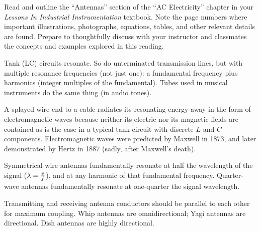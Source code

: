 

Read and outline the ``Antennas'' section of the ``AC Electricity'' chapter in your {\it Lessons In Industrial Instrumentation} textbook.  Note the page numbers where important illustrations, photographs, equations, tables, and other relevant details are found.  Prepare to thoughtfully discuss with your instructor and classmates the concepts and examples explored in this reading.














Tank (LC) circuits resonate.  So do unterminated transmission lines, but with multiple resonance frequencies (not just one): a fundamental frequency plus harmonics (integer multiples of the fundamental).  Tubes used in musical instruments do the same thing (in audio tones).

\vskip 10pt

A splayed-wire end to a cable radiates its resonating energy away in the form of electromagnetic waves because neither its electric nor its magnetic fields are contained as is the case in a typical tank circuit with discrete $L$ and $C$ components.  Electromagnetic waves were predicted by Maxwell in 1873, and later demonstrated by Hertz in 1887 (sadly, after Maxwell's death).

\vskip 10pt

Symmetrical wire antennas fundamentally resonate at half the wavelength of the signal ($\lambda = {v \over f}$), and at any harmonic of that fundamental frequency.  Quarter-wave antennas fundamentally resonate at one-quarter the signal wavelength.

\vskip 10pt

Transmitting and receiving antenna conductors should be parallel to each other for maximum coupling.  Whip antennas are omnidirectional; Yagi antennas are directional.  Dish antennas are highly directional.









